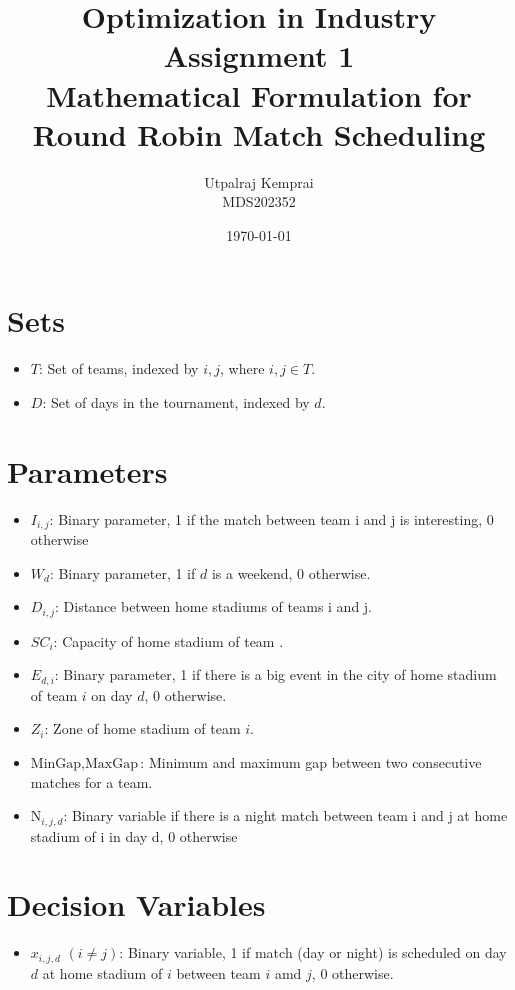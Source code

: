 \documentclass[a4paper, 12pt]{article}
\title{Optimization in Industry Assignment 1 \\ Mathematical Formulation for Round Robin Match Scheduling}
\author{Utpalraj Kemprai \\ MDS202352}
\date{\today}
\begin{document}
\maketitle

\section*{Sets}
\begin{itemize}
    \item $T$: Set of teams, indexed by $i, j$, where $i, j \in T$.
    \item $D$: Set of days in the tournament, indexed by $d$.
\end{itemize}

\section*{Parameters}
\begin{itemize}
    \item $I_{i,j}$: Binary parameter, 1 if the match between team i and j is interesting, 0 otherwise
    \item $W_{d}$: Binary parameter, 1 if $d$ is a weekend, 0 otherwise.
    \item $D_{i,j}$: Distance between home stadiums of teams i and j.
    \item $SC_{i}$: Capacity of home stadium of team .
    \item $E_{d,i}$: Binary parameter, 1 if there is a big event in the city of home stadium of team $i$ on day $d$, 0 otherwise.
    \item $Z_i$: Zone of home stadium of team $i$.
    \item $\text{MinGap}, \text{MaxGap}$: Minimum and maximum gap between two consecutive matches for a team.
    \item $\text{N}_{i,j,d}$: Binary variable if there is a night match between team i and j at home stadium of i in day d, 0 otherwise
\end{itemize}

\section*{Decision Variables}
\begin{itemize}
    \item $x_{i,j,d}$ $(i \neq j)$: Binary variable, 1 if match (day or night) is scheduled on day $d$ at home stadium of $i$ between team $i$ amd $j$, 0 otherwise.
    
\end{itemize}
\end{document}
